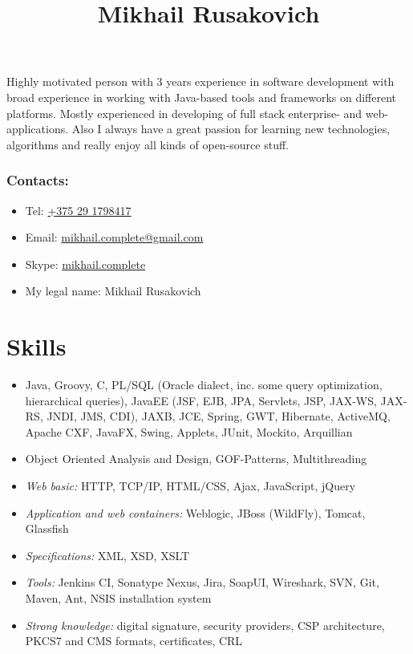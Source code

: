 \documentclass[a4paper, 12pt]{article}
\title{Mikhail Rusakovich}
\author{}
\date{}
\newcommand{\itemlabel}[1]{
    \textit{#1:}}
\begin{document}
\maketitle

Highly motivated person with 3 years experience in software development with broad experience in working with Java-based tools and frameworks on different platforms.
Mostly experienced in developing of full stack enterprise- and web- applications.
Also I always have a great passion for learning new technologies, algorithms and really enjoy all kinds of open-source stuff.

\subsubsection*{Contacts:}
\begin{itemize}
    \item Tel: \href{tel:+375291798417}{+375 29 1798417}
    \item Email: \href{mailto:mikhail.complete@gmail.com}{mikhail.complete@gmail.com}
    \item Skype: \href{callto:mikhail.complete}{mikhail.complete}
    \item My legal name: Mikhail Rusakovich
\end{itemize}


\section*{Skills}

    \begin{itemize}
        \item Java, Groovy, C, PL/SQL (Oracle dialect, inc. some query optimization, hierarchical queries), JavaEE (JSF, EJB, JPA, Servlets, JSP, JAX-WS, JAX-RS, JNDI, JMS, CDI), JAXB, JCE, Spring, GWT, Hibernate, ActiveMQ, Apache CXF, JavaFX, Swing, Applets, JUnit, Mockito, Arquillian
        \item Object Oriented Analysis and Design, GOF-Patterns, Multithreading
        \item \itemlabel{Web basic} HTTP, TCP/IP, HTML/CSS, Ajax, JavaScript, jQuery
        \item \itemlabel{Application and web containers} Weblogic, JBoss (WildFly), Tomcat, Glassfish
        \item \itemlabel{Specifications} XML, XSD, XSLT
        \item \itemlabel{Tools} Jenkins CI, Sonatype Nexus, Jira, SoapUI, Wireshark, SVN, Git, Maven, Ant, NSIS installation system
        \item \itemlabel{Strong knowledge} digital signature, security providers, CSP architecture, PKCS7 and CMS formats, certificates, CRL
    \end{itemize}
\end{document}
